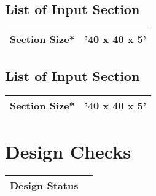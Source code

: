 \documentclass{article}%
\begin{document}
\subsection{List of Input Section}%
\label{subsec:ListofInputSection}%
\renewcommand{\arraystretch}{1.2}%
\begin{tabularx}{\textwidth}{|p{4cm}|X|}%
\hline%
\multicolumn{1}{|c|}{Section Size*}&\multicolumn{1}{|X|}{'40 x 40 x 5'}\\%
\hline%
\end{tabularx}

%
%
\newpage%

\subsection{List of Input Section}%
\label{subsec:ListofInputSection}%
\renewcommand{\arraystretch}{1.2}%
\begin{tabularx}{\textwidth}{|p{4cm}|X|}%
\hline%
\multicolumn{1}{|c|}{Section Size*}&\multicolumn{1}{|X|}{'40 x 40 x 5'}\\%
\hline%
\end{tabularx}

%
%
\newpage%

\section{Design Checks}%
\label{sec:DesignChecks}%
\renewcommand{\arraystretch}{1.2}%
\begin{tabularx}{\textwidth}{|>{\centering}p{12.5cm}|>{\centering\arraybackslash}X|}%
\hline%
\textbf{Design Status}&\cellcolor{Red}{\textbf{Fail}}\\%
\hline%
\end{tabularx}%
\end{document}
